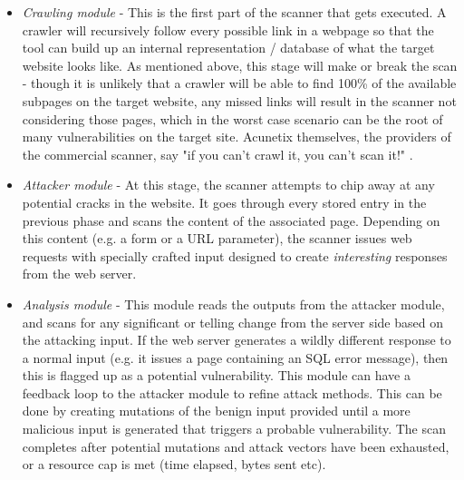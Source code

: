 \begin{itemize}
	
	\item \textit{Crawling module} - This is the first part of the scanner that gets executed. A crawler will recursively follow every possible link in a webpage so that the tool can build up an internal representation / database of what the target website looks like. As mentioned above, this stage will make or break the scan - though it is unlikely that a crawler will be able to find 100\% of the available subpages on the target website, any missed links will result in the scanner not considering those pages, which in the worst case scenario can be the root of many vulnerabilities on the target site. Acunetix themselves, the providers of the commercial scanner, say "if you can't crawl it, you can't scan it!" \cite{acunetixQuoteCrawling}. 
	
	\item \textit{Attacker module} - At this stage, the scanner attempts to chip away at any potential cracks in the website. It goes through every stored entry in the previous phase and scans the content of the associated page. Depending on this content (e.g. a form or a URL parameter), the scanner issues web requests with specially crafted input designed to create \textit{interesting} responses from the web server.
	
	\item \textit{Analysis module} - This module reads the outputs from the attacker module, and scans for any significant or telling change from the server side based on the attacking input. If the web server generates a wildly different response to a normal input (e.g. it issues a page containing an SQL error message), then this is flagged up as a potential vulnerability. This module can have a feedback loop to the attacker module to refine attack methods. This can be done by creating mutations of the benign input provided until a more malicious input is generated that triggers a probable vulnerability. The scan completes after potential mutations and attack vectors have been exhausted, or a resource cap is met (time elapsed, bytes sent etc).
\end{itemize}


